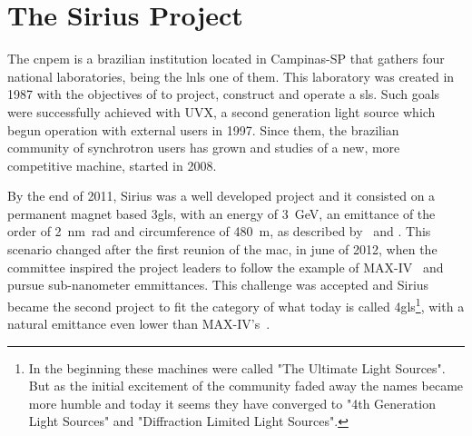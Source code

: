 \section{The Sirius Project}

  	The \gls{cnpem} is a brazilian institution located in Campinas-SP that gathers four national laboratories, being the \gls{lnls} one of them. This laboratory was created in 1987 with the objectives of to project, construct and operate a \gls{sls}. Such goals were successfully achieved with UVX, a second generation light source which begun operation with external users in 1997. Since them, the brazilian community of synchrotron users has grown and studies of a new, more competitive machine, started in 2008.

    By the end of 2011, Sirius was a well developed project and it consisted on a permanent magnet based \gls{3gls}, with an energy of \SI{3}{\giga\electronvolt}, an emittance of the order of \SI{2}{\nano\meter\radian} and circumference of \SI{480}{\meter}, as described by~ and . This scenario changed after the first reunion of the \gls{mac}, in june of 2012, when the committee inspired the project leaders to follow the example of MAX-IV~\cite{Leemann2009} and pursue sub-nanometer emmittances. This challenge was accepted and Sirius became the second project to fit the category of what today is called \gls{4gls}\footnote{In the beginning these machines were called "The Ultimate Light Sources". But as the initial excitement of the community faded away the names became more humble and today it seems they have converged to "4th Generation Light Sources" and "Diffraction Limited Light Sources".}, with a natural emittance even lower than MAX-IV's~\cite{Liu2013}.


